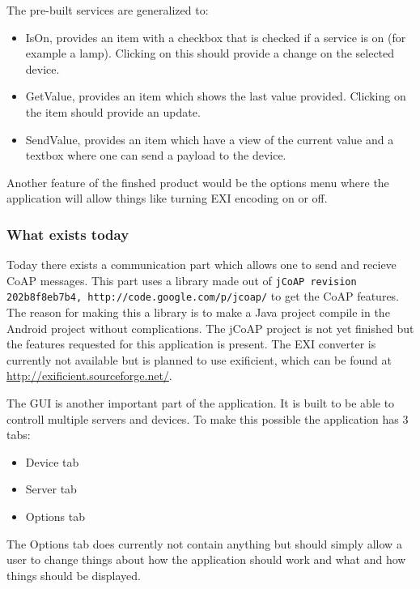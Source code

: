 The pre-built services are generalized to: 
\begin{itemize}
\item IsOn, provides an item with a checkbox that is checked if a service is on (for example a lamp). Clicking on this should provide a change on the selected device.
\item GetValue, provides an item which shows the last value provided. Clicking on the item should provide an update.
\item SendValue, provides an item which have a view of the current value and a textbox where one can send a payload to the device.
\end{itemize}

Another feature of the finshed product would be the options menu where the application will allow things like turning EXI encoding on or off. 

\subsubsection{What exists today}

Today there exists a communication part which allows one to send and recieve CoAP messages. This part uses a library made out of \texttt{jCoAP revision 202b8f8eb7b4, http://code.google.com/p/jcoap/}%
to get the CoAP features. The reason for making this a library is to make a Java project compile in the Android project without complications. The jCoAP project is not yet finished but the features requested for this application is present. The EXI converter is currently not available but is planned to use exificient, 
which can be found at \url{http://exificient.sourceforge.net/}.

The GUI is another important part of the application. It is built to be able to controll multiple servers and devices. 
To make this possible the application has 3 tabs:	%
\begin{itemize}
 \item Device tab
 \item Server tab
 \item Options tab
\end{itemize}

The Options tab does currently not contain anything but should simply allow a user to change things about how the application should work and what and how things should be displayed. 

